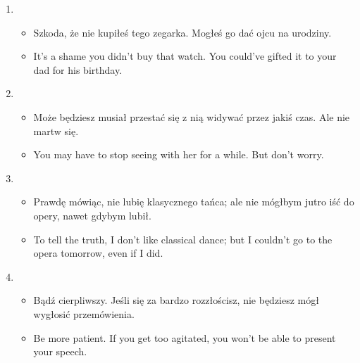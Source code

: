 \documentclass[a4paper]{article}
\begin{document}
\begin{enumerate}
\begin{itemize}
    \end{itemize}
    \item \begin{itemize}
        \item Szkoda, że nie kupiłeś tego zegarka. Mogłeś go dać ojcu na urodziny.
        \item It's a shame you didn't buy that watch. You could've gifted it to your dad for his birthday.
    \end{itemize}
    \item \begin{itemize}
        \item Może będziesz musiał przestać się z nią widywać przez jakiś czas. Ale nie martw się.
        \item You may have to stop seeing with her for a while. But don't worry.
    \end{itemize}
    \item \begin{itemize}
        \item Prawdę mówiąc, nie lubię klasycznego tańca; ale nie mógłbym jutro iść do opery, nawet gdybym lubił.
        \item To tell the truth, I don't like classical dance; but I couldn't go to the opera tomorrow, even if I did.
    \end{itemize}
    \item \begin{itemize}
        \item Bądź cierpliwszy. Jeśli się za bardzo rozzłościsz, nie będziesz mógł wygłosić przemówienia.
        \item Be more patient. If you get too agitated, you won't be able to present your speech.
    \end{itemize}
\end{enumerate}
\end{document}
